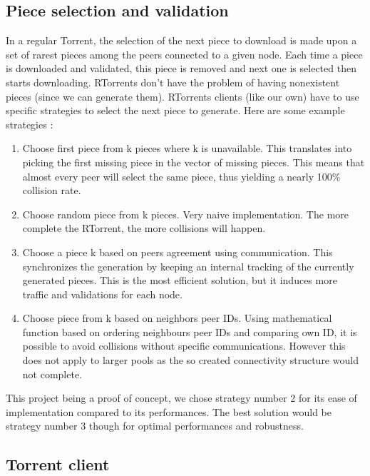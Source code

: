 \documentclass[a4paper]{article}
\begin{document}
{\subsection{Piece selection and validation}
In a regular Torrent, the selection of the next piece to download is made upon a set of rarest pieces among the peers connected to a given node. Each time a piece is downloaded and validated, this piece is removed and next one is selected then starts downloading. RTorrents don't have the problem of having nonexistent pieces (since we can generate them). RTorrents clients (like our own) have to use specific strategies to select the next piece to generate. Here are some example strategies :\vspace{2mm}

\begin{enumerate}
	\item Choose first piece from k pieces where k is unavailable. This translates into picking the first missing piece in the vector of missing pieces. This means that almost every peer will select the same piece, thus yielding a nearly  100\% collision rate.
	\item Choose random piece from k pieces. Very naive implementation. The more complete the RTorrent, the more collisions will happen.
	\item Choose a piece k based on peers agreement using communication. This synchronizes the generation by keeping an internal tracking of the currently generated pieces. This is the most efficient solution, but it induces more traffic and validations for each node.
	\item Choose piece from k based on neighbors peer IDs. Using mathematical function based on ordering neighbours peer IDs and comparing own ID, it is possible to avoid collisions without specific communications. However this does not apply to larger pools as the so created connectivity structure would not complete.
\end{enumerate}
\vspace{2mm}

This project being a proof of concept, we chose strategy number 2 for its ease of implementation compared to its performances. The best solution would be strategy number 3 though for optimal performances and robustness.\\

\subsection{Torrent client}

}
\end{document}
